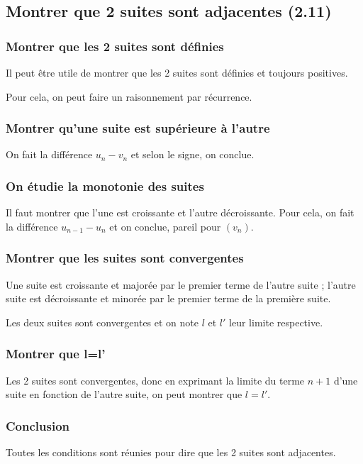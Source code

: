 \documentclass[french]{yLectureNote}
\begin{document}
\subsection{Montrer que 2 suites sont adjacentes (2.11)}
\subsubsection{Montrer que les 2 suites sont définies}
Il peut \^etre utile de montrer que les 2 suites sont définies et toujours positives.

Pour cela, on peut faire un raisonnement par récurrence.
\subsubsection{Montrer qu'une suite est supérieure à l'autre}
On fait la différence $u_n-v_n$ et selon le signe, on conclue.
\subsubsection{On étudie la monotonie des suites}
Il faut montrer que l'une est croissante et l'autre décroissante. Pour cela, on fait la différence $u_{n-1}-u_n$ et on conclue, pareil pour $(v_n)$.
\subsubsection{Montrer que les suites sont convergentes}
Une suite est croissante et majorée par le premier terme de l'autre suite ; l'autre suite est décroissante et minorée par le premier terme de la première suite.

Les deux suites sont convergentes et on note $l$ et $l'$ leur limite respective.

\subsubsection{Montrer que l=l'}

Les 2 suites sont convergentes, donc en exprimant la limite du terme $n+1$ d'une suite en fonction de l'autre suite, on peut montrer que $l=l'$.
\subsubsection{Conclusion}
Toutes les conditions sont réunies pour dire que les 2 suites sont adjacentes.
\end{document}
